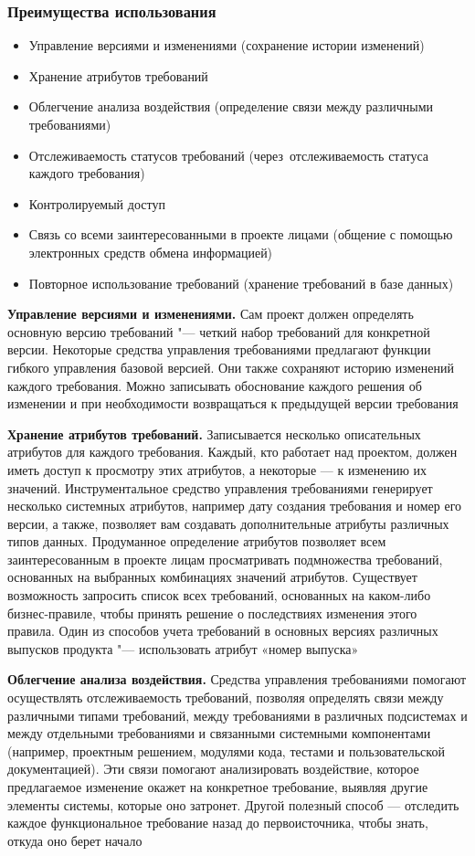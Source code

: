 \documentclass{../industrial-development}
\begin{document}
\begin{frame} \frametitle{Преимущества использования}
	\begin{itemize}
\item Управление версиями и изменениями (сохранение истории изменений)
\item Хранение атрибутов требований
\item Облегчение анализа воздействия (определение связи между различными требованиями)
\item Отслеживаемость статусов требований (через~отслеживаемость статуса каждого требования)
\item Контролируемый доступ
\item Связь со всеми заинтересованными в проекте лицами (общение с помощью электронных средств обмена информацией)
\item Повторное использование требований (хранение требований в базе данных)
  	\end{itemize}
\end{frame}

\lecturenotes

\textbf{Управление версиями и изменениями.} 
Сам проект должен определять основную версию требований "--- четкий набор требований для конкретной версии. Некоторые средства управления требованиями предлагают функции гибкого управления базовой версией. Они также сохраняют историю изменений каждого требования. Можно записывать обоснование каждого решения об изменении и при необходимости возвращаться к предыдущей версии требования

\textbf{Хранение атрибутов требований.} 
Записывается несколько описательных атрибутов для каждого требования. Каждый, кто работает над проектом, должен иметь доступ к просмотру этих атрибутов, а некоторые — к изменению их значений. Инструментальное средство управления требованиями генерирует несколько системных атрибутов, например дату создания требования и номер его версии, а также, позволяет вам создавать дополнительные атрибуты различных типов данных. Продуманное определение атрибутов позволяет всем заинтересованным в проекте лицам просматривать подмножества требований, основанных на выбранных комбинациях значений атрибутов. Существует возможность запросить список всех требований, основанных на каком-либо бизнес-правиле, чтобы принять решение о последствиях изменения этого правила. Один из способов учета требований в основных версиях различных выпусков продукта "--- использовать атрибут «номер выпуска»

\textbf{Облегчение анализа воздействия.} 
Средства управления требованиями помогают осуществлять отслеживаемость требований, позволяя определять связи между различными типами требований, между требованиями в различных подсистемах и между отдельными требованиями и связанными системными компонентами (например, проектным решением, модулями кода, тестами и пользовательской документацией). Эти связи помогают анализировать воздействие, которое предлагаемое изменение окажет на конкретное требование, выявляя другие элементы системы, которые оно затронет. Другой полезный способ — отследить каждое функциональное требование назад до первоисточника, чтобы знать, откуда оно берет начало
\end{document}
